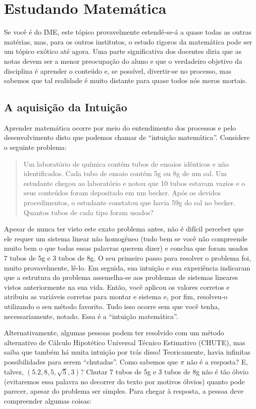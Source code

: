 \documentclass[
  portuguese,
  letterpaper,
  DIV=11,
  numbers=noendperiod]{scrreport}
\begin{document}
\section{Estudando Matemática}\label{estudando-matemuxe1tica}

Se você é do IME, este tópico provavelmente estendê-se-á a quase todas
as outras matérias, mas, para os outros institutos, o estudo rigoros da
matemática pode ser um tópico exótico até agora. Uma parte significativa
dos docentes diria que as notas devem ser a menor preocupação do aluno e
que o verdadeiro objetivo da disciplina é aprender o conteúdo e, se
possível, divertir-se no processo, mas sabemos que tal realidade é muito
distante para quase todos nós meros mortais.

\subsection{A aquisição da
Intuição}\label{a-aquisiuxe7uxe3o-da-intuiuxe7uxe3o}

Aprender matemática ocorre por meio do entendimento dos processos e pelo
desenvolvimento disto que podemos chamar de ``intuição matemática''.
Considere o seguinte problema:

\begin{quote}
Um laboratório de química contém tubos de ensaios idênticos e não
identificados. Cada tubo de ensaio contém 5g ou 8g de um sal. Um
estudante chegou ao laboratório e notou que 10 tubos estavam vazios e o
seus conteúdos foram depositado em um becker. Após os devidos
procedimentos, o estudante constatou que havia 59g do sal no becker.
Quantos tubos de cada tipo foram usados?
\end{quote}

Apesar de nunca ter visto este exato problema antes, não é difícil
perceber que ele requer um sistema linear não homogêneo (tudo bem se
você não compreende muito bem o que todas essas palavras querem dizer) e
conclua que foram usados 7 tubos de 5g e 3 tubos de 8g. O seu primeiro
passo para resolver o problema foi, muito provavelmente, lê-lo. Em
seguida, sua intuição e sua experiência indicaram que a estrutura do
problema assemelha-se aos problemas de sistemas lineares vistos
anteriormente na sua vida. Então, você aplicou os valores corretos e
atribuiu as variáveis corretas para montar e sistema e, por fim,
resolveu-o utilizando o seu método favorito. Tudo isso ocorre sem que
você tenha, necessariamente, notado. Essa é a ``intuição matemática''.

Alternativamente, algumas pessoas podem ter resolvido com um método
alternativo de Cálculo Hipotético Universal Técnico Estimativo (CHUTE),
mas saiba que também há muita intuição por trás disso! Teoricamente,
havia infinitas possibilidades para serem ``chutadas''. Como sabemos que
\(\pi\) não é a resposta? E, talvez, \((5.2, 8, 5, \sqrt{5}, 3)\)?
Chutar 7 tubos de 5g e 3 tubos de 8g não é tão óbvio (evitaremos essa
palavra no decorrer do texto por motivos óbvios) quanto pode parecer,
apesar do problema ser simples. Para chegar à resposta, a pessoa deve
compreender algumas coisas:
\end{document}
